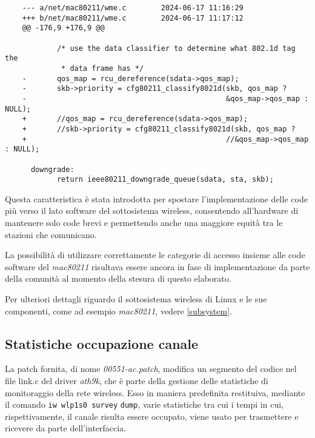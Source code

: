 \begin{lstlisting}
    --- a/net/mac80211/wme.c        2024-06-17 11:16:29
    +++ b/net/mac80211/wme.c        2024-06-17 11:17:12
    @@ -176,9 +176,9 @@
     
            /* use the data classifier to determine what 802.1d tag the
             * data frame has */
    -       qos_map = rcu_dereference(sdata->qos_map);
    -       skb->priority = cfg80211_classify8021d(skb, qos_map ?
    -                                              &qos_map->qos_map : NULL);
    +       //qos_map = rcu_dereference(sdata->qos_map);
    +       //skb->priority = cfg80211_classify8021d(skb, qos_map ?
    +                                              //&qos_map->qos_map : NULL);
     
      downgrade:
            return ieee80211_downgrade_queue(sdata, sta, skb);
\end{lstlisting}
Questa caratteristica è stata introdotta per spostare l'implementazione delle code più verso il lato software del sottosistema wireless, consentendo all'hardware di mantenere solo code brevi e permettendo anche una maggiore equità tra le stazioni che comunicano.

La possibilità di utilizzare correttamente le categorie di accesso insieme alle code software del \textit{mac80211} risultava essere ancora in fase di implementazione da parte della comunità al momento della stesura di questo elaborato.

Per ulteriori dettagli riguardo il sottosistema wireless di Linux e le sue componenti, come ad esempio \textit{mac80211}, vedere \autoref{subsystem}.

\subsection[Statistiche occupazione canale]{Statistiche occupazione canale}
La patch fornita, di nome \textit{00551-ac.patch}, modifica un segmento del codice nel file link.c del driver \textit{ath9k}, che è parte della gestione delle statistiche di monitoraggio della rete wireless. Esso in maniera predefinita restituiva, mediante il comando \verb|iw wlp1s0 survey| \verb|dump|, varie statistiche tra cui i tempi in cui, rispettivamente, il canale risulta essere occupato, viene usato per trasmettere e ricevere da parte dell'interfaccia. 

